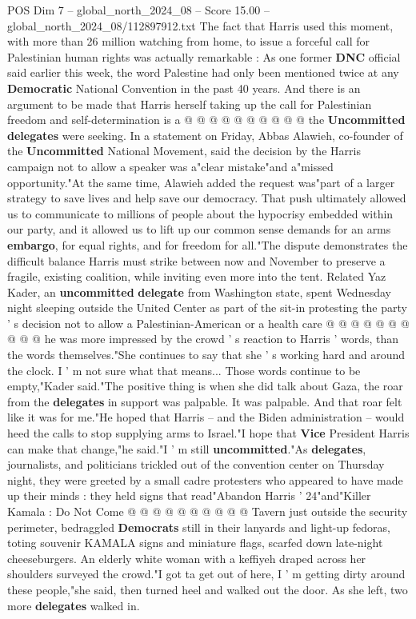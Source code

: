 \begin{textsample}{POS Dim 7 – global\_north\_2024\_08 – Score 15.00 – global\_north\_2024\_08/112897912.txt}
The fact that Harris used this moment, with more than 26 million watching from home, to issue a forceful call for Palestinian human rights was actually remarkable : As one former \textbf{DNC} official said earlier this week, the word Palestine had only been mentioned twice at any \textbf{Democratic} National Convention in the past 40 years.
And there is an argument to be made that Harris herself taking up the call for Palestinian freedom and self-determination is a @ @ @ @ @ @ @ @ @ @ the \textbf{Uncommitted} \textbf{delegates} were seeking.
In a statement on Friday, Abbas Alawieh, co-founder of the \textbf{Uncommitted} National Movement, said the decision by the Harris campaign not to allow a speaker was a"clear mistake"and a"missed opportunity."At the same time, Alawieh added the request was"part of a larger strategy to save lives and help save our democracy.
That push ultimately allowed us to communicate to millions of people about the hypocrisy embedded within our party, and it allowed us to lift up our common sense demands for an arms \textbf{embargo}, for equal rights, and for freedom for all."The dispute demonstrates the difficult balance Harris must strike between now and November to preserve a fragile, existing coalition, while inviting even more into the tent.
Related Yaz Kader, an \textbf{uncommitted} \textbf{delegate} from Washington state, spent Wednesday night sleeping outside the United Center as part of the sit-in protesting the party ' s decision not to allow a Palestinian-American or a health care @ @ @ @ @ @ @ @ @ @ he was more impressed by the crowd ' s reaction to Harris ' words, than the words themselves."She continues to say that she ' s working hard and around the clock.
I ' m not sure what that means...
Those words continue to be empty,"Kader said."The positive thing is when she did talk about Gaza, the roar from the \textbf{delegates} in support was palpable.
It was palpable.
And that roar felt like it was for me."He hoped that Harris -- and the Biden administration -- would heed the calls to stop supplying arms to Israel."I hope that \textbf{Vice} President Harris can make that change,"he said."I ' m still \textbf{uncommitted}."As \textbf{delegates}, journalists, and politicians trickled out of the convention center on Thursday night, they were greeted by a small cadre protesters who appeared to have made up their minds : they held signs that read"Abandon Harris ' 24"and"Killer Kamala : Do Not Come @ @ @ @ @ @ @ @ @ @ Tavern just outside the security perimeter, bedraggled \textbf{Democrats} still in their lanyards and light-up fedoras, toting souvenir KAMALA signs and miniature flags, scarfed down late-night cheeseburgers.
An elderly white woman with a keffiyeh draped across her shoulders surveyed the crowd."I got ta get out of here, I ' m getting dirty around these people,"she said, then turned heel and walked out the door.
As she left, two more \textbf{delegates} walked in.

\end{textsample}
